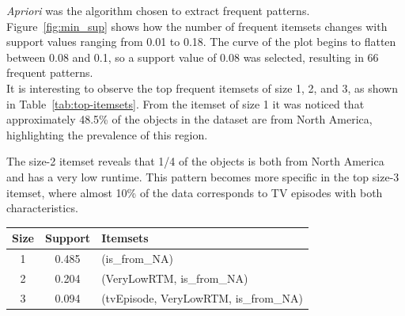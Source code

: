 \textit{Apriori} was the algorithm chosen to extract frequent patterns. 
Figure~\ref{fig:min_sup} shows how the number of frequent itemsets changes with support values ranging from 0.01 to 0.18. 
The curve of the plot begins to flatten between 0.08 and 0.1, so a support value of 0.08 was selected, resulting in 66 frequent patterns.\\

It is interesting to observe the top frequent itemsets of size 1, 2, and 3, as shown in Table~\ref{tab:top-itemsets}. 
From the itemset of size 1 it was noticed that approximately 48.5\% of the objects in the dataset are from North America, highlighting the prevalence of this region.

\begin{minipage}{0.42\textwidth}
The size-2 itemset reveals that 1/4 of the objects is both from North America and has a very low runtime.
This pattern becomes more specific in the top size-3 itemset, where almost 10\% of the data corresponds to TV episodes with both characteristics.
\end{minipage}
\hfill
\begin{minipage}{0.56\textwidth}
\centering
\begin{tabular}{ccl}
\toprule
\textbf{Size} & \textbf{Support} & \textbf{Itemsets} \\
\midrule
1 & 0.485 & (is\_from\_NA) \\
2 & 0.204 & (VeryLowRTM, is\_from\_NA) \\
3 & 0.094 & (tvEpisode, VeryLowRTM, is\_from\_NA) \\
\bottomrule
\end{tabular}
\label{tab:top-itemsets}
\end{minipage}






